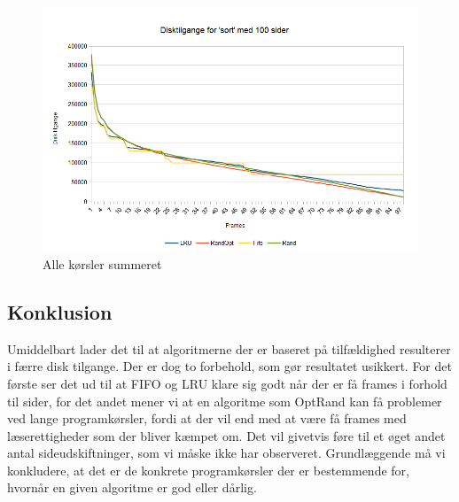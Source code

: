 \begin{figure}[ht]
\centerline{\includegraphics[scale=1]{graph/stat_sort}}
\FloatBarrier
\caption{Alle kørsler summeret}
\label{fig:sort}
\end{figure}

\subsection{Konklusion}
Umiddelbart lader det til at algoritmerne der er baseret på tilfældighed resulterer i færre disk tilgange. Der er dog to forbehold, som gør resultatet usikkert. For det første ser det ud til at FIFO og LRU klare sig godt når der er få frames i forhold til sider, for det andet mener vi at en algoritme som OptRand kan få problemer ved lange programkørsler, fordi at der vil end med at være få frames med læserettigheder som der bliver kæmpet om. Det vil givetvis føre til et øget andet antal sideudskiftninger, som vi måske ikke har observeret. Grundlæggende må vi konkludere, at det er de konkrete programkørsler der er bestemmende for, hvornår en given algoritme er god eller dårlig. 

